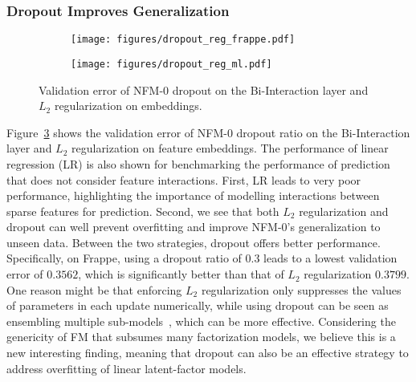 \subsubsection{\textbf{Dropout Improves Generalization}}
\label{ss:exper_dropout}
\begin{figure}[t]
	\centering
	\begin{subfigure}[b]{0.24\textwidth}
		\centering
		\texttt{[image: figures/dropout\_reg\_frappe.pdf]}
		\vspace{-18pt}
\label{fig:dropout_reg_frappe}
	\end{subfigure} \hspace{-7pt}
	\begin{subfigure}[b]{0.24\textwidth}
		\centering
		\texttt{[image: figures/dropout\_reg\_ml.pdf]}
		\vspace{-18pt}
\label{fig:dropout_reg_ml}
	\end{subfigure} \hspace{-7pt}
	\caption{Validation error of NFM-0 \wrt dropout on the Bi-Interaction layer and $L_2$ regularization on embeddings.}
	\vspace{-15pt}
	\label{fig:dropout_reg}
\end{figure}

Figure~\ref{fig:dropout_reg} shows the validation error of NFM-0 \wrt dropout ratio on the Bi-Interaction layer and $L_2$ regularization on feature embeddings. The performance of linear regression (LR) is also shown for benchmarking the performance of prediction that does not consider feature interactions. 
First, LR leads to very poor performance, highlighting the importance of modelling interactions between sparse features for prediction. 
Second, we see that both $L_2$ regularization and dropout can well prevent overfitting and improve NFM-0's generalization to unseen data. 
Between the two strategies, dropout offers better performance. Specifically, on Frappe, using a dropout ratio of 0.3 leads to a lowest validation error of $0.3562$, which is significantly better than that of $L_2$ regularization $0.3799$.
One reason might be that enforcing $L_2$ regularization only suppresses the values of parameters in each update numerically, while using dropout can be seen as ensembling multiple sub-models~\cite{srivastava2014dropout}, which can be more effective. 
Considering the genericity of FM that subsumes many factorization models, we believe this is a new interesting finding, meaning that dropout can also be an effective strategy to address overfitting of linear latent-factor models. 

